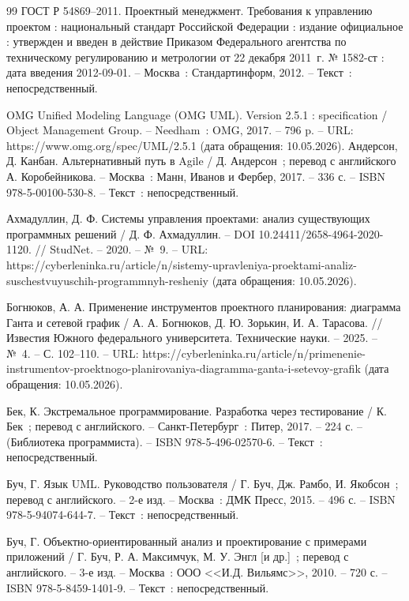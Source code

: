 \begin{thebibliography}{99}
	 ГОСТ Р 54869--2011. Проектный менеджмент. Требования к управлению проектом : национальный стандарт Российской Федерации : издание официальное : утвержден и введен в действие Приказом Федерального агентства по техническому регулированию и метрологии от 22 декабря 2011~г. № 1582-ст : дата введения 2012-09-01. -- Москва~: Стандартинформ, 2012. -- Текст~: непосредственный.

	 OMG Unified Modeling Language (OMG UML). Version 2.5.1 : specification / Object Management Group. -- Needham~: OMG, 2017. -- 796 p. -- URL: https://www.omg.org/spec/UML/2.5.1 (дата обращения: 10.05.2026).
	 Андерсон, Д. Канбан. Альтернативный путь в Agile / Д. Андерсон~; перевод с английского А. Коробейникова. -- Москва~: Манн, Иванов и Фербер, 2017. -- 336 с. -- ISBN 978-5-00100-530-8. -- Текст~: непосредственный.

	 Ахмадуллин, Д. Ф. Системы управления проектами: анализ существующих программных решений / Д. Ф. Ахмадуллин. -- DOI 10.24411/2658-4964-2020-1120. // StudNet. -- 2020. -- №~9. -- URL: https://cyberleninka.ru/article/n/sistemy-upravleniya-proektami-analiz-suschestvuyuschih-programmnyh-resheniy (дата обращения: 10.05.2026).

	 Богнюков, А. А. Применение инструментов проектного планирования: диаграмма Ганта и сетевой график / А. А. Богнюков, Д. Ю. Зорькин, И. А. Тарасова. // Известия Южного федерального университета. Технические науки. -- 2025. -- №~4. -- С. 102--110. -- URL: https://cyberleninka.ru/article/n/primenenie-instrumentov-proektnogo-planirovaniya-diagramma-ganta-i-setevoy-grafik (дата обращения: 10.05.2026).

	 Бек, К. Экстремальное программирование. Разработка через тестирование / К. Бек~; перевод с английского. -- Санкт-Петербург~: Питер, 2017. -- 224 с. -- (Библиотека программиста). -- ISBN 978-5-496-02570-6. -- Текст~: непосредственный.

	 Буч, Г. Язык UML. Руководство пользователя / Г. Буч, Дж. Рамбо, И. Якобсон~; перевод с английского. -- 2-е изд. -- Москва~: ДМК Пресс, 2015. -- 496 с. -- ISBN 978-5-94074-644-7. -- Текст~: непосредственный.

	 Буч, Г. Объектно-ориентированный анализ и проектирование с примерами приложений / Г. Буч, Р. А. Максимчук, М. У. Энгл [и др.]~; перевод с английского. -- 3-е изд. -- Москва~: ООО <<И.Д. Вильямс>>, 2010. -- 720 с. -- ISBN 978-5-8459-1401-9. -- Текст~: непосредственный.


\end{thebibliography}
